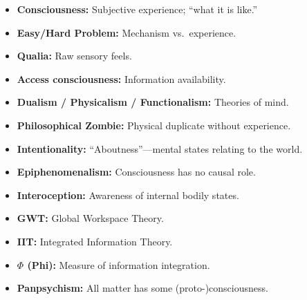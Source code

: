 \begin{defbox}
\begin{itemize}
  \item \textbf{Consciousness:} Subjective experience; ``what it is like.''
  \item \textbf{Easy/Hard Problem:} Mechanism vs.\ experience.
  \item \textbf{Qualia:} Raw sensory feels.
  \item \textbf{Access consciousness:} Information availability.
  \item \textbf{Dualism / Physicalism / Functionalism:} Theories of mind.
  \item \textbf{Philosophical Zombie:} Physical duplicate without experience.
  \item \textbf{Intentionality:} ``Aboutness''---mental states relating to the world.
  \item \textbf{Epiphenomenalism:} Consciousness has no causal role.
  \item \textbf{Interoception:} Awareness of internal bodily states.
  \item \textbf{GWT:} Global Workspace Theory.
  \item \textbf{IIT:} Integrated Information Theory.
  \item \textbf{$\Phi$ (Phi):} Measure of information integration.
  \item \textbf{Panpsychism:} All matter has some (proto-)consciousness.
\end{itemize}
\end{defbox}

